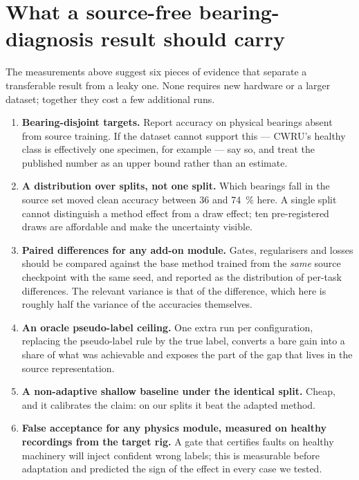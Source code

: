 \section{What a source-free bearing-diagnosis result should carry}
\label{sec:recommendations}

The measurements above suggest six pieces of evidence that separate a transferable result from a leaky one. None requires
new hardware or a larger dataset; together they cost a few additional runs.

\begin{enumerate}
  \item \textbf{Bearing-disjoint targets.} Report accuracy on physical bearings absent from source training. If the dataset
        cannot support this --- CWRU's healthy class is effectively one specimen, for example --- say so, and treat the
        published number as an upper bound rather than an estimate.
  \item \textbf{A distribution over splits, not one split.} Which bearings fall in the source set moved clean accuracy
        between \SI{36}{} and \SI{74}{\percent} here. A single split cannot distinguish a method effect from a draw effect;
        ten pre-registered draws are affordable and make the uncertainty visible.
  \item \textbf{Paired differences for any add-on module.} Gates, regularisers and losses should be compared against the
        base method trained from the \emph{same} source checkpoint with the same seed, and reported as the distribution of
        per-task differences. The relevant variance is that of the difference, which here is roughly half the variance of
        the accuracies themselves.
  \item \textbf{An oracle pseudo-label ceiling.} One extra run per configuration, replacing the pseudo-label rule by the
        true label, converts a bare gain into a share of what was achievable and exposes the part of the gap that lives in
        the source representation.
  \item \textbf{A non-adaptive shallow baseline under the identical split.} Cheap, and it calibrates the claim: on our
        splits it beat the adapted method.
  \item \textbf{False acceptance for any physics module, measured on healthy recordings from the target rig.} A gate that
        certifies faults on healthy machinery will inject confident wrong labels; this is measurable before adaptation and
        predicted the sign of the effect in every case we tested.
\end{enumerate}

